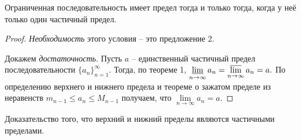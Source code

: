 \begin{theorem}
    Ограниченная последовательность имеет предел
    тогда и только тогда, когда у неё только
    один частичный предел.
\end{theorem}
\begin{proof}
    \emph{Необходимость}
    этого условия -- это предложение 2.

    Докажем \emph{достаточность}.
    Пусть $a$ -- единственный частичный предел
    последовательности $\{a_n\}_{n=1}^{\infty}.$
    Тогда, по теореме 1,
    $\operatorname*{\underline{lim}}\limits_{n\rightarrow\infty}a_n=
        \operatorname*{\overline{lim}}\limits_{n\rightarrow\infty}a_n=a.$
    По определению верхнего и нижнего предела
    и теореме о зажатом пределе из неравенств
    $m_{n-1}\leq a_n\leq M_{n-1}$
    получаем, что $\lim\limits_{n\rightarrow\infty}
        a_n=a.$
\end{proof}

\newpage
\begin{problem}
Доказательство того, что верхний и нижний пределы являются частичными пределами.
\end{problem}


